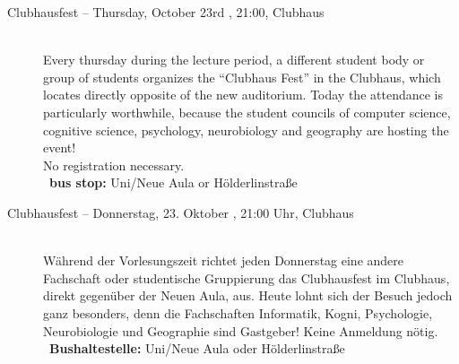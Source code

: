 \begin{description}


\ifml
    \item[Clubhausfest -- Thursday, October 23rd \YEAR, 21:00, Clubhaus]\ \\
    Every thursday during the lecture period, a different student body or group of students organizes the "`Clubhaus Fest"' in
    the Clubhaus, which locates directly opposite of the new auditorium. Today the attendance is particularly worthwhile, because
    the student councils of computer science, cognitive science, psychology, neurobiology and geography are hosting the event! \\
    No registration necessary.\\
    ~\textbf{bus stop:} Uni/Neue Aula or Hölderlinstraße
\else
    \item[Clubhausfest -- Donnerstag, 23. Oktober \YEAR, 21:00 Uhr, Clubhaus]\ \\
    Während der Vorlesungszeit richtet jeden Donnerstag eine andere Fachschaft oder studentische Gruppierung das Clubhausfest
    im Clubhaus, direkt gegenüber der Neuen Aula, aus. Heute lohnt sich der Besuch jedoch ganz besonders, denn die Fachschaften
    Informatik, Kogni, Psychologie, Neurobiologie und Geographie sind Gastgeber! %
    Keine Anmeldung nötig.\\
    ~\textbf{Bushaltestelle:} Uni/Neue Aula oder Hölderlinstraße
\fi


\end{description}
